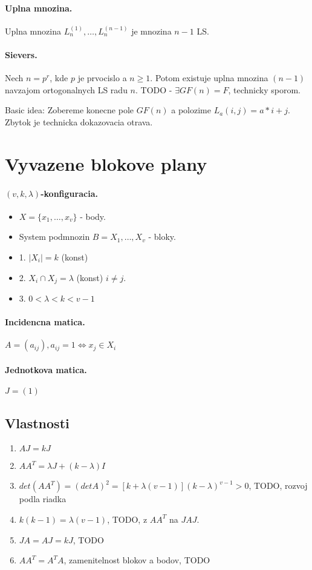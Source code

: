 \documentclass[10pt,a4paper]{article}
\begin{document}
\paragraph{Uplna mnozina.}
Uplna mnozina $L_n^{(1)}, \ldots ,L_n^{(n-1)}$ je mnozina $n-1$ LS.

\paragraph{Sievers.}
Nech $n=p^r$, kde $p$ je prvocislo a $n \geq 1$. Potom existuje uplna mnozina $(n-1)$ navzajom ortogonalnych LS radu $n$.
TODO - $\exists GF(n) = F$, technicky sporom. 

Basic idea: Zobereme konecne pole $GF(n)$ a polozime $L_a(i,j) = a*i+j$. Zbytok je technicka
dokazovacia otrava.

\section{Vyvazene blokove plany}
\paragraph{$(v,k,\lambda)$-konfiguracia.}
\begin{itemize}
\item $X = \{x_1, \ldots, x_v\}$ - body.
\item System podmnozin $B = {X_1, \ldots, X_v}$ - bloky. 
\item 1. $|X_i|=k$ (konst)
\item 2. $X_i \cap X_j = \lambda$ (konst) $i \neq j$.
\item 3. $0 < \lambda < k < v-1$
\end{itemize}
\paragraph{Incidencna matica.}
$A=(a_{ij}), a_{ij} = 1 \Leftrightarrow x_j \in X_i$
\paragraph{Jednotkova matica.}
$J=(1)$
\subsection{Vlastnosti}
\begin{enumerate}
\item $AJ = kJ$
\item $AA^T = \lambda J + (k-\lambda)I$
\item $det(AA^T)=(det A)^2=[k + \lambda(v-1)](k-\lambda)^{v-1} > 0$, TODO, rozvoj podla riadka
\item $k(k-1) = \lambda(v-1)$, TODO, z $AA^T$ na $JAJ$. 
\item $JA=AJ=kJ$, TODO
\item $AA^T=A^TA$, zamenitelnost blokov a bodov, TODO
\end{enumerate}
\end{document}

